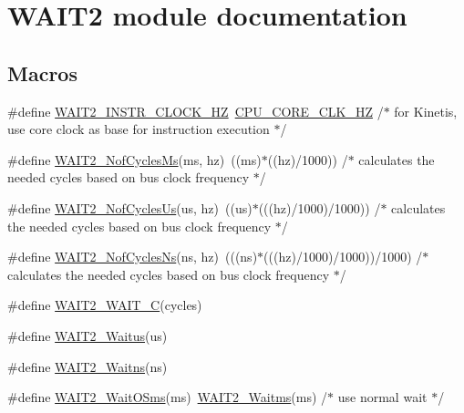 \hypertarget{group___w_a_i_t2__module}{}\section{W\+A\+I\+T2 module documentation}
\label{group___w_a_i_t2__module}
\subsection*{Macros}
\begin{DoxyCompactItemize}
\item 
\#define \hyperlink{group___w_a_i_t2__module_ga42be87062ba4bee82e74182008e6afbc}{W\+A\+I\+T2\+\_\+\+I\+N\+S\+T\+R\+\_\+\+C\+L\+O\+C\+K\+\_\+\+HZ}~\hyperlink{group___cpu__module_ga9dee0abd722c849e54c662ab11a1d2cf}{C\+P\+U\+\_\+\+C\+O\+R\+E\+\_\+\+C\+L\+K\+\_\+\+HZ} /$\ast$ for Kinetis, use core clock as base for instruction execution $\ast$/
\item 
\#define \hyperlink{group___w_a_i_t2__module_gaf13a8ab79ece3a554abaaff60399e8c8}{W\+A\+I\+T2\+\_\+\+Nof\+Cycles\+Ms}(ms,  hz)~((ms)$\ast$((hz)/1000)) /$\ast$ calculates the needed cycles based on bus clock frequency $\ast$/
\item 
\#define \hyperlink{group___w_a_i_t2__module_gaea93c12588315526fa7ebe7c305ea8f0}{W\+A\+I\+T2\+\_\+\+Nof\+Cycles\+Us}(us,  hz)~((us)$\ast$(((hz)/1000)/1000)) /$\ast$ calculates the needed cycles based on bus clock frequency $\ast$/
\item 
\#define \hyperlink{group___w_a_i_t2__module_gacbc1ee8c0a39d4fab8af0efd19fe798f}{W\+A\+I\+T2\+\_\+\+Nof\+Cycles\+Ns}(ns,  hz)~(((ns)$\ast$(((hz)/1000)/1000))/1000) /$\ast$ calculates the needed cycles based on bus clock frequency $\ast$/
\item 
\#define \hyperlink{group___w_a_i_t2__module_ga79daf93af3a325f56dfa4c24c325c03f}{W\+A\+I\+T2\+\_\+\+W\+A\+I\+T\+\_\+C}(cycles)
\item 
\#define \hyperlink{group___w_a_i_t2__module_ga42b1b78d02425ac522fcacd744e66d91}{W\+A\+I\+T2\+\_\+\+Waitus}(us)
\item 
\#define \hyperlink{group___w_a_i_t2__module_ga395bbf074bbc2214cb866b60ee51a93d}{W\+A\+I\+T2\+\_\+\+Waitns}(ns)
\item 
\#define \hyperlink{group___w_a_i_t2__module_gadcb672b21de6ee7a7239a4ec1372474b}{W\+A\+I\+T2\+\_\+\+Wait\+O\+Sms}(ms)~\hyperlink{group___w_a_i_t2__module_ga0ca6d6b6223491aaa5fca0ef97ecee27}{W\+A\+I\+T2\+\_\+\+Waitms}(ms) /$\ast$ use normal wait $\ast$/
\end{DoxyCompactItemize}
